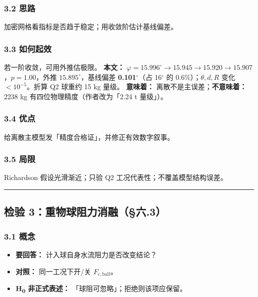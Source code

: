 \documentclass[UTF8,a4paper,zihao=-4]{ctexart}
\begin{document}
\subsubsection{\texorpdfstring{3.2 思路}{3.2 思路}}
加密网格看指标是否趋于稳定；用收敛阶估计基线偏差。

\subsubsection{\texorpdfstring{3.3 如何起效}{3.3 如何起效}}
若一阶收敛，可用外推估极限。  
\textbf{本文：} \(\varphi=15.996^\circ\to15.945\to15.920\to15.907\)，\(p=1.00\)，外推 \(15.895^\circ\)，基线偏差 \textbf{0.101$^\circ$}（占 16$^\circ$ 的 0.6\%）；\(\theta,d,R\) 变化 \(<10^{-5}\)。折算 Q2 球重约 15 kg 量级。  
\textbf{意味着：} 离散不是主误差；\textbf{不意味着：} 2238 kg 有四位物理精度（作者改为「2.24 t 量级」）。

\subsubsection{\texorpdfstring{3.4 优点}{3.4 优点}}
给离散主模型发「精度合格证」，并修正有效数字叙事。

\subsubsection{\texorpdfstring{3.5 局限}{3.5 局限}}
Richardson 假设光滑渐近；只验 Q2 工况代表性；不覆盖模型结构误差。

\vspace{0.4em}\hrule\vspace{0.4em}

\subsection{\texorpdfstring{检验 3：重物球阻力消融（§六.3）}{检验 3：重物球阻力消融（§六.3）}}

\subsubsection{\texorpdfstring{3.1 概念}{3.1 概念}}
\begin{itemize}[leftmargin=1.5em]
\item \textbf{要回答：} 计入球自身水流阻力是否改变结论？
\item \textbf{对照：} 同一工况下开/关 \(F_{c,\mathrm{ball}}\)。
\item \textbf{H\textsubscript{0} 非正式表述：} 「球阻可忽略」；拒绝则该项应保留。
\end{itemize}
\end{document}
